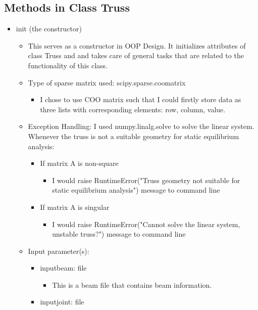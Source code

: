 \documentclass{article}
\begin{document}
\subsection{Methods in Class Truss}
\begin{itemize}
\item init (the constructor)
\begin{itemize}
\item This serves as a constructor in OOP Design. It initializes attributes of class Truss and and takes care of general tasks that are related to the functionality of this class.
\item Type of sparse matrix used: scipy.sparse.coomatrix
\begin{itemize}
\item I chose to use COO matrix such that I could firstly store data as three lists with corresponding elements: row, column, value. 
\end{itemize}
\item Exception Handling: I used numpy.linalg.solve to solve the linear system. Whenever the truss is not a suitable geometry for static equilibrium analysis: 
\begin{itemize}
\item If matrix A is non-square 
\begin{itemize}
\item I would raise RuntimeError("Truss geometry not suitable for static equilibrium analysis") message to command line
\end{itemize}
\item If matrix A is singular
\begin{itemize}
\item I would raise RuntimeError("Cannot solve the linear system, unstable truss?")  message to command line
\end{itemize}
\end{itemize}
\end{itemize}
\begin{itemize}
\item Input parameter(s):
\begin{itemize}
\item inputbeam: file
\begin{itemize}
\item This is a beam file that contains beam information.
\end{itemize}
\end{itemize}
\begin{itemize}
\item inputjoint: file

\end{itemize}
\end{itemize}
\end{itemize}
\end{document}
